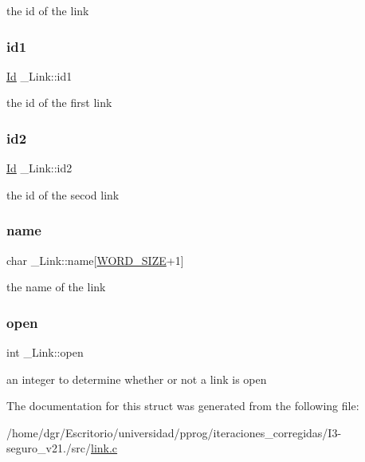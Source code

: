 the id of the link \mbox{\label{struct__Link_a62d6aee205ac5d4d738bb7448fbaf9cc}} 
\subsubsection{\texorpdfstring{id1}{id1}}
{\footnotesize\ttfamily \hyperlink{types_8h_a845e604fb28f7e3d97549da3448149d3}{Id} \+\_\+\+Link\+::id1}

the id of the first link \mbox{\label{struct__Link_a9d8710f0f005598c8d6a1b48d5bf07d7}} 
\subsubsection{\texorpdfstring{id2}{id2}}
{\footnotesize\ttfamily \hyperlink{types_8h_a845e604fb28f7e3d97549da3448149d3}{Id} \+\_\+\+Link\+::id2}

the id of the secod link \mbox{\label{struct__Link_a020ee863120055b29609157b9de3c84d}} 
\subsubsection{\texorpdfstring{name}{name}}
{\footnotesize\ttfamily char \+\_\+\+Link\+::name\mbox{[}\hyperlink{types_8h_a92ed8507d1cd2331ad09275c5c4c1c89}{W\+O\+R\+D\+\_\+\+S\+I\+ZE}+1\mbox{]}}

the name of the link \mbox{\label{struct__Link_a5df9107f4ea513f3741d9e4883f4678a}} 
\subsubsection{\texorpdfstring{open}{open}}
{\footnotesize\ttfamily int \+\_\+\+Link\+::open}

an integer to determine whether or not a link is open 

The documentation for this struct was generated from the following file\+:\begin{DoxyCompactItemize}
\item 
/home/dgr/\+Escritorio/universidad/pprog/iteraciones\+\_\+corregidas/\+I3-\/seguro\+\_\+v21./src/\hyperlink{link_8c}{link.\+c}\end{DoxyCompactItemize}
